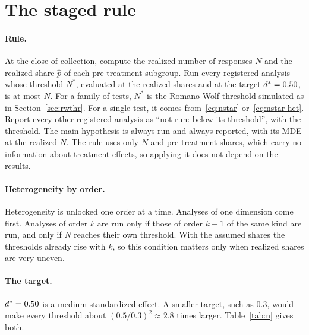 \documentclass[11pt]{article}
\begin{document}
\section{The staged rule}

\paragraph{Rule.} At the close of collection, compute the realized number of responses $N$ and the
realized share $\hat p$ of each pre-treatment subgroup. Run every registered analysis whose
threshold $N^{*}$, evaluated at the realized shares and at the target $d^{*} = 0.50$, is at
most $N$. For a family of tests, $N^{*}$ is the Romano-Wolf threshold simulated as in
Section~\ref{sec:rwthr}. For a single test, it comes from~\eqref{eq:nstar}
or~\eqref{eq:nstar-het}. Report every other registered analysis as ``not run: below its
threshold'', with the threshold. The main hypothesis is always run and always reported, with its MDE
at the realized $N$. The rule uses only $N$ and pre-treatment shares, which carry no information
about treatment effects, so applying it does not depend on the results.

\paragraph{Heterogeneity by order.} Heterogeneity is unlocked one order at a time. Analyses of one
dimension come first. Analyses of order $k$ are run only if those of order $k - 1$ of the same
kind are run, and only if $N$ reaches their own threshold. With the assumed shares the thresholds already
rise with $k$, so this condition matters only when realized shares are very uneven.

\paragraph{The target.} $d^{*} = 0.50$ is a medium standardized effect. A smaller target, such as
$0.3$, would make every threshold about $(0.5/0.3)^2 \approx 2.8$ times larger. Table~\ref{tab:n}
gives both.

\begin{table}[!htbp]
  \centering
  \small
  
  \caption{Responses needed before each analysis is run. $N^{*}$: the simulated Romano-Wolf
  threshold, rounded up to the next $\RoundTo$. For a single test ($m = 1$), the formula. Bound: the
  Bonferroni bound from equations~\eqref{eq:nstar} and~\eqref{eq:nstar-het}. $^{\dagger}$The
  simulation found no Romano-Wolf threshold below the bound, so the bound is kept. Heterogeneity
  rows assume the shares of Section~\ref{sec:sim}. Row 2b assumes that the H5 subgroup holds a
  quarter of the responses. If it holds half, H5 alone needs $\NStarHFiveHalfRW$. At the close all rows are recomputed at the realized shares.}
  \label{tab:n}
\end{table}
\end{document}
